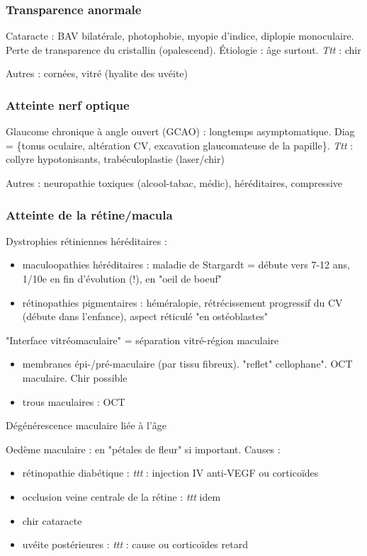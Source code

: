 \documentclass[11pt]{article}
\begin{document}
\subsubsection{Transparence anormale}
\label{sec:org3f1ed81}
Cataracte : BAV bilatérale, photophobie, myopie d'indice, diplopie
monoculaire. Perte de transparence du cristallin (opalescend). Étiologie : âge
surtout. \emph{Ttt} : chir

Autres : cornées, vitré (hyalite des uvéite)

\subsubsection{Atteinte nerf optique}
\label{sec:org20bde52}
Glaucome chronique à angle ouvert (GCAO) : longtemps asymptomatique. Diag =
\{\inc tonus oculaire, altération CV, excavation glaucomateuse de la
papille\}. \emph{Ttt} : collyre hypotonisants, trabéculoplastie (laser/chir)

Autres : neuropathie toxiques (alcool-tabac, médic), héréditaires, compressive

\subsubsection{Atteinte de la rétine/macula}
\label{sec:orgc12c42f}
Dystrophies rétiniennes héréditaires :
\begin{itemize}
\item maculoopathies héréditaires : maladie de Stargardt = débute vers 7-12 ans,
1/10e en fin d'évolution (!), en "oeil de boeuf"
\item rétinopathies pigmentaires : héméralopie, rétrécissement progressif du CV
(débute dans l'enfance), aspect réticulé "en ostéoblastes"
\end{itemize}
"Interface vitréomaculaire" = séparation vitré-région maculaire
\begin{itemize}
\item membranes épi-/pré-maculaire (par tissu fibreux). "reflet" cellophane". OCT
maculaire. Chir possible
\item trous maculaires : OCT
\end{itemize}
Dégénérescence maculaire liée à l'âge 

Oedème maculaire : en "pétales de fleur" si important. Causes : 
\begin{itemize}
\item rétinopathie diabétique : \emph{ttt} : injection IV anti-VEGF ou corticoïdes
\item occlusion veine centrale de la rétine : \emph{ttt} idem
\item chir cataracte
\item uvéite postérieures : \emph{ttt} : cause ou corticoïdes retard
\end{itemize}
\end{document}
